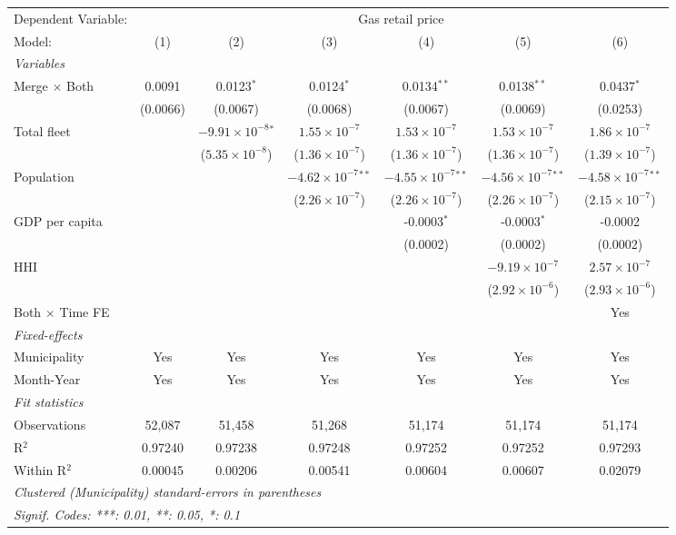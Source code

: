 \documentclass[
]{article}
\begin{document}
\begin{tabular}{lcccccc}
\tabularnewline\midrule\midrule
Dependent Variable:&\multicolumn{6}{c}{Gas retail price}\\
Model:&(1) & (2) & (3) & (4) & (5) & (6)\\
\midrule \emph{Variables}&   &   &   &   &   &  \\
Merge $\times $ Both & 0.0091 & 0.0123$^{*}$ & 0.0124$^{*}$ & 0.0134$^{**}$ & 0.0138$^{**}$ & 0.0437$^{*}$\\
  &(0.0066) & (0.0067) & (0.0068) & (0.0067) & (0.0069) & (0.0253)\\
Total fleet &    & $-9.91\times 10^{-8}$$^{*}$ & $1.55\times 10^{-7}$ & $1.53\times 10^{-7}$ & $1.53\times 10^{-7}$ & $1.86\times 10^{-7}$\\
  &   & ($5.35\times 10^{-8}$) & ($1.36\times 10^{-7}$) & ($1.36\times 10^{-7}$) & ($1.36\times 10^{-7}$) & ($1.39\times 10^{-7}$)\\
Population &    &    & $-4.62\times 10^{-7}$$^{**}$ & $-4.55\times 10^{-7}$$^{**}$ & $-4.56\times 10^{-7}$$^{**}$ & $-4.58\times 10^{-7}$$^{**}$\\
  &   &    & ($2.26\times 10^{-7}$) & ($2.26\times 10^{-7}$) & ($2.26\times 10^{-7}$) & ($2.15\times 10^{-7}$)\\
GDP per capita &    &    &    & -0.0003$^{*}$ & -0.0003$^{*}$ & -0.0002\\
  &   &    &    & (0.0002) & (0.0002) & (0.0002)\\
HHI &    &    &    &    & $-9.19\times 10^{-7}$ & $2.57\times 10^{-7}$\\
  &   &    &    &    & ($2.92\times 10^{-6}$) & ($2.93\times 10^{-6}$)\\
Both $\times$ Time FE &  &  &  &  &  & Yes\\
\midrule \emph{Fixed-effects}&   &   &   &   &   &  \\
Municipality & Yes & Yes & Yes & Yes & Yes & Yes\\
Month-Year & Yes & Yes & Yes & Yes & Yes & Yes\\
\midrule \emph{Fit statistics}&  & & & & & \\
Observations & 52,087&51,458&51,268&51,174&51,174&51,174\\
R$^2$ & 0.97240&0.97238&0.97248&0.97252&0.97252&0.97293\\
Within R$^2$ & 0.00045&0.00206&0.00541&0.00604&0.00607&0.02079\\
\midrule\midrule\multicolumn{7}{l}{\emph{Clustered (Municipality) standard-errors in parentheses}}\\
\multicolumn{7}{l}{\emph{Signif. Codes: ***: 0.01, **: 0.05, *: 0.1}}\\
\end{tabular}
\end{document}
